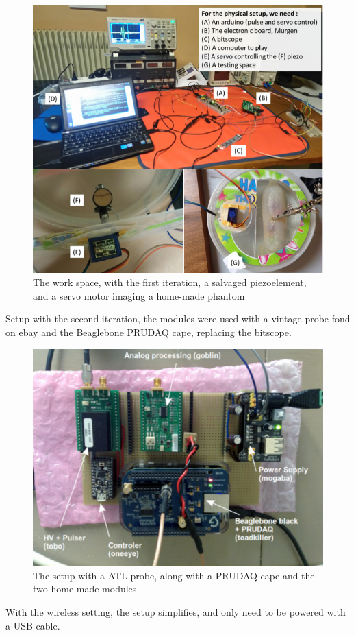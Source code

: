 \documentclass[letterpaper, 10 pt, conference]{ieeeconf} %
\begin{document}
\begin{figure}%
\centering
\includegraphics[width=.8\linewidth]{space}
\caption{The work space, with the first iteration, a salvaged piezoelement, and a servo motor imaging a home-made phantom}
\label{fig:workspace}
\end{figure}

Setup with the second iteration, the modules were used with a vintage probe fond on ebay and the Beaglebone PRUDAQ cape, replacing the bitscope.

\begin{figure}%
\centering
\includegraphics[width=.8\linewidth]{prudaq}
\caption{The setup with a ATL probe, along with a PRUDAQ cape and the two home made modules}
\label{fig:atl}
\end{figure}


With the wireless setting, the setup simplifies, and only need to be powered with a USB cable.
\end{document}
